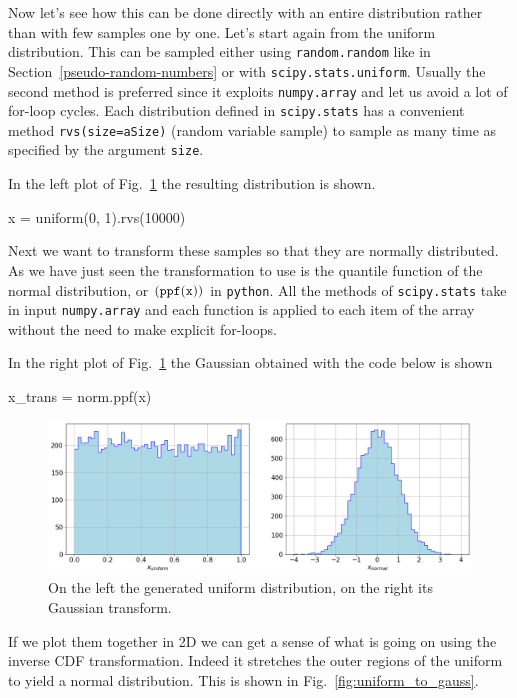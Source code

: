 Now let's see how this can be done directly with an entire distribution rather than with few samples one by one. Let's start again from the uniform distribution. This can be sampled either using \texttt{random.random} like in Section~\ref{pseudo-random-numbers} or with \texttt{scipy.stats.uniform}. Usually the second method is preferred since it exploits \texttt{numpy.array} and let us avoid a lot of for-loop cycles. 
Each distribution defined in \texttt{scipy.stats} has a convenient method \texttt{rvs(size=aSize)} (random variable sample) to sample as many time as specified by the argument \texttt{size}. 

In the left plot of Fig.~\ref{fig:uniform_and_gauss} the resulting distribution is shown.

\begin{ipython}
x = uniform(0, 1).rvs(10000)
\end{ipython}

Next we want to transform these samples so that they are normally distributed. As we have just seen the transformation to use is the quantile function of the normal distribution, or \((\tt{ppf(x))}\) in \texttt{python}. All the methods of \texttt{scipy.stats} take in input \texttt{numpy.array} and each function is applied to each item of the array without the need to make explicit for-loops.

In the right plot of Fig.~\ref{fig:uniform_and_gauss} the Gaussian obtained with the code below is shown

\begin{ipython}
x_trans = norm.ppf(x)
\end{ipython}

\begin{figure}[htb]
\centering
\includegraphics[width=1.\textwidth]{figures/uniform_gauss}
\caption{On the left the generated uniform distribution, on the right its Gaussian transform.}
\label{fig:uniform_and_gauss}
\end{figure}

If we plot them together in 2D we can get a sense of what is going on using the inverse CDF transformation. Indeed it stretches the outer regions of the uniform to yield a normal distribution. This is shown in Fig.~\ref{fig:uniform_to_gauss}. 
    
